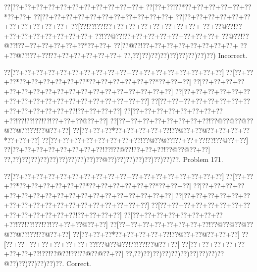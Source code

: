 \documentclass[a5paper]{article}
\begin{document}
\begin{center}
{\goo
\0??[\0??+\0??+\0??+\0??+\0??+\0??+\0??+\0??+\0??+\0??+\0??+
\0??[\0??+\0??!\0??*\0??+\0??+\0??+\0??+\0??+\0??*\0??+\0??+
\0??[\0??+\0??+\0??+\0??+\0??+\0??+\0??+\0??+\0??+\0??+\0??+
\0??[\0??+\0??+\0??+\0??+\0??+\0??+\0??+\0??+\0??+\0??+\0??+
\0??[\0??!\0??!\0??!\0??+\0??+\0??+\0??+\0??+\0??+\0??+\0??+
\0??+\0??@\0??!\0??+\0??+\0??+\0??+\0??+\0??+\0??+\0??+
\0??!\0??@\0??!\0??+\0??+\0??+\0??+\0??+\0??+\0??+\0??+
\0??@\0??!\0??@\0??!\0??+\0??+\0??+\0??+\0??+\0??*\0??+\0??+
\0??[\0??@\0??!\0??+\0??+\0??+\0??+\0??+\0??+\0??+\0??+
\0??+\0??@\0??!\0??+\0??!\0??+\0??+\0??+\0??+\0??+\0??+
\0??,\0??)\0??)\0??)\0??)\0??)\0??)\0??)\0??)\0??)
}
Incorrect. 

\end{center}
\newpage
\begin{center}
{\goo
\0??[\0??+\0??+\0??+\0??+\0??+\0??+\0??+\0??+\0??+\0??+\0??+\0??+\0??+\0??+\0??+\0??+\0??+\0??]
\0??[\0??+\0??+\0??*\0??+\0??+\0??+\0??+\0??+\0??*\0??+\0??+\0??+\0??+\0??+\0??*\0??+\0??+\0??]
\0??[\0??+\0??+\0??+\0??+\0??+\0??+\0??+\0??+\0??+\0??+\0??+\0??+\0??+\0??+\0??+\0??+\0??+\0??]
\0??[\0??+\0??+\0??+\0??+\0??+\0??+\0??+\0??+\0??+\0??+\0??+\0??+\0??+\0??+\0??+\0??+\0??+\0??]
\0??[\0??+\0??+\0??+\0??+\0??+\0??+\0??+\0??+\0??+\0??+\0??+\0??+\0??+\0??!\0??+\0??+\0??+\0??]
\0??[\0??+\0??+\0??+\0??+\0??+\0??+\0??+\0??+\0??!\0??!\0??!\0??!\0??!\0??+\0??+\0??@\0??+\0??]
\0??[\0??+\0??+\0??+\0??+\0??+\0??+\0??+\0??!\0??@\0??@\0??@\0??@\0??@\0??!\0??!\0??@\0??+\0??]
\0??[\0??+\0??+\0??*\0??+\0??+\0??+\0??+\0??!\0??@\0??+\0??@\0??+\0??+\0??+\0??*\0??+\0??+\0??]
\0??[\0??+\0??+\0??+\0??+\0??+\0??+\0??+\0??!\0??@\0??@\0??!\0??+\0??+\0??!\0??!\0??@\0??+\0??]
\0??[\0??+\0??+\0??+\0??+\0??+\0??+\0??+\0??!\0??!\0??@\0??!\0??+\0??+\0??!\0??@\0??@\0??+\0??]
\0??,\0??)\0??)\0??)\0??)\0??)\0??)\0??)\0??)\0??)\0??@\0??)\0??)\0??)\0??)\0??)\0??)\0??)\0??.
}
Problem 171.

\end{center}
\begin{center}
{\goo
\0??[\0??+\0??+\0??+\0??+\0??+\0??+\0??+\0??+\0??+\0??+\0??+\0??+\0??+\0??+\0??+\0??+\0??+\0??]
\0??[\0??+\0??+\0??*\0??+\0??+\0??+\0??+\0??+\0??*\0??+\0??+\0??+\0??+\0??+\0??*\0??+\0??+\0??]
\0??[\0??+\0??+\0??+\0??+\0??+\0??+\0??+\0??+\0??+\0??+\0??+\0??+\0??+\0??+\0??+\0??+\0??+\0??]
\0??[\0??+\0??+\0??+\0??+\0??+\0??+\0??+\0??+\0??+\0??+\0??+\0??+\0??+\0??+\0??+\0??+\0??+\0??]
\0??[\0??+\0??+\0??+\0??+\0??+\0??+\0??+\0??+\0??+\0??+\0??+\0??+\0??+\0??!\0??+\0??+\0??+\0??]
\0??[\0??+\0??+\0??+\0??+\0??+\0??+\0??+\0??+\0??!\0??!\0??!\0??!\0??!\0??+\0??+\0??@\0??+\0??]
\0??[\0??+\0??+\0??+\0??+\0??+\0??+\0??+\0??!\0??@\0??@\0??@\0??@\0??@\0??!\0??!\0??@\0??+\0??]
\0??[\0??+\0??+\0??*\0??+\0??+\0??+\0??+\0??!\0??@\0??+\0??@\0??+\0??+\0??]
\0??[\0??+\0??+\0??+\0??+\0??+\0??+\0??+\0??!\0??@\0??@\0??!\0??!\0??!\0??@\0??+\0??]
\0??[\0??+\0??+\0??+\0??+\0??+\0??+\0??+\0??!\0??!\0??@\0??!\0??!\0??@\0??@\0??+\0??]
\0??,\0??)\0??)\0??)\0??)\0??)\0??)\0??)\0??)\0??)\0??@\0??)\0??)\0??)\0??)\0??)\0??.
}
Correct. 

\end{center}
\end{document}

